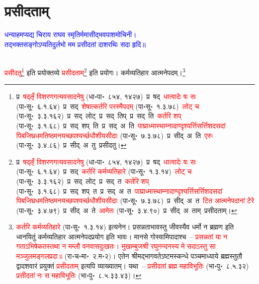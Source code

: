 \section[प्रसीदताम्]{प्रसीदताम्}
\centering\textcolor{blue}{धन्याहमप्यद्य चिराय राघव स्मृतिर्ममासीद्भवपाशमोचिनी।\nopagebreak\\
तद्भक्तसङ्गोऽप्यतिदुर्लभो मम प्रसीदतां दाशरथिः सदा हृदि॥}\nopagebreak\\
\\
\fontsize{14}{21}\selectfont\begin{sloppypar}\justifying\noindent\hspace{10mm} \textcolor{red}{प्रसीदतु}\footnote{प्र~\textcolor{red}{षद्ऌँ विशरण\-गत्यवसादनेषु} (धा॰पा॰~८५४, १४२७)~\arrow प्र~षद्~\arrow \textcolor{red}{धात्वादेः षः सः} (पा॰सू॰~६.१.६४)~\arrow प्र~सद्~\arrow \textcolor{red}{शेषात्कर्तरि परस्मैपदम्} (पा॰सू॰~१.३.७८)~\arrow \textcolor{red}{लोट् च} (पा॰सू॰~३.३.१६२)~\arrow प्र~सद्~लोट्~\arrow प्र~सद्~तिप्~\arrow प्र~सद्~ति~\arrow \textcolor{red}{कर्तरि शप्‌} (पा॰सू॰~३.१.६८)~\arrow प्र~सद्~शप्~ति~\arrow प्र~सद्~अ~ति~\arrow \textcolor{red}{पाघ्रा\-ध्मास्थाम्ना\-दाण्दृश्यर्त्ति\-सर्त्तिशदसदां पिब\-जिघ्र\-धम\-तिष्ठ\-मन\-यच्छ\-पश्यर्च्छ\-धौ\-शीय\-सीदाः} (पा॰सू॰~७.३.७८)~\arrow प्र~सीद्~अ~ति~\arrow \textcolor{red}{एरुः} (पा॰सू॰~३.४.८६)~\arrow प्र~सीद्~अ~तु~\arrow प्रसीदतु।} इति प्रयोक्तव्ये \textcolor{red}{प्रसीदताम्}\footnote{प्र~\textcolor{red}{षद्ऌँ विशरण\-गत्यवसादनेषु} (धा॰पा॰~८५४, १४२७)~\arrow प्र~षद्~\arrow \textcolor{red}{धात्वादेः षः सः} (पा॰सू॰~६.१.६४)~\arrow प्र~सद्~\arrow \textcolor{red}{कर्तरि कर्म\-व्यतिहारे} (पा॰सू॰~१.३.१४)~\arrow \textcolor{red}{लोट् च} (पा॰सू॰~३.३.१६२)~\arrow प्र~सद्~लोट्~\arrow प्र~सद्~त~\arrow \textcolor{red}{कर्तरि शप्‌} (पा॰सू॰~३.१.६८)~\arrow प्र~सद्~शप्~त~\arrow प्र~सद्~अ~त~\arrow \textcolor{red}{पाघ्रा\-ध्मास्थाम्ना\-दाण्दृश्यर्त्ति\-सर्त्तिशदसदां पिब\-जिघ्र\-धम\-तिष्ठ\-मन\-यच्छ\-पश्यर्च्छ\-धौ\-शीय\-सीदाः} (पा॰सू॰~७.३.७८)~\arrow प्र~सीद्~अ~त~\arrow \textcolor{red}{टित आत्मनेपदानां टेरे} (पा॰सू॰~३.४.७९)~\arrow प्र~सीद्~अ~ते~\arrow \textcolor{red}{आमेतः} (पा॰सू॰~३.४.९०)~\arrow प्र~सीद्~अ~ताम्~\arrow प्रसीदताम्।} इति प्रयोगः।
कर्म\-व्यतिहार आत्मनेपदम्।\footnote{\textcolor{red}{कर्तरि कर्म\-व्यतिहारे} (पा॰सू॰~१.३.१४) इत्यनेन। प्रसन्नताभावस्तु जीवस्यैव धर्मो न ब्रह्मण इति ध्वनयितुं कर्मव्यतिहार आत्मनेपदप्रयोग इति भावः। मानसे गोस्वामि\-पादाश्च~– \textcolor{red}{प्रसन्नतां या न गताऽभिषेकतस्तथा न मम्लौ वनवास\-दुःखतः। मुखाम्बुजश्री रघुनन्दनस्य मे सदाऽस्तु सा मञ्जुलमङ्गलप्रदा॥} (रा॰च॰मा॰~२.म॰२)। एतेन श्रीमद्भागवतेऽष्टम\-स्कन्धे पञ्चमाध्याये ब्रह्मस्तुतौ द्वादशवारं प्रयुक्तं \textcolor{red}{प्रसीदताम्} इत्यपि व्याख्यातम्। यथा~– \textcolor{red}{प्रसीदतां ब्रह्म महाविभूतिः} (भा॰पु॰~८.५.३२) \textcolor{red}{प्रसीदतां नः स महाविभूतिः} (भा॰पु॰~८.५.३३.४३)।}\end{sloppypar}
